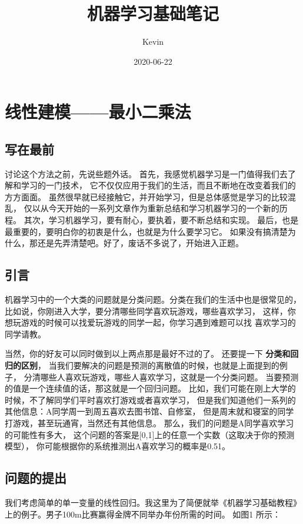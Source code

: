 \documentclass[a4paper,12pt]{book}
\begin{document}
    \title{机器学习基础笔记}
    \author{Kevin}
    \date{2020-06-22}
    \maketitle

    \newpage
    \tableofcontents

    \chapter{线性建模——最小二乘法}
    \section{写在最前}
    讨论这个方法之前，先说些题外话。
    首先，我感觉机器学习是一门值得我们去了解和学习的一门技术，
    它不仅仅应用于我们的生活，而且不断地在改变着我们的方方面面。
    虽然很早就已经接触它，并开始学习，但是总体感觉是学习的比较混乱，
    仅以从今天开始的一系列文章作为重新总结和学习机器学习的一个新的历程。
    其次，学习机器学习，要有耐心，要执着，要不断总结和实现。
    最后，也是最重要的，要明白你的初衷是什么，也就是为什么要学习它。
    如果没有搞清楚为什么，那还是先弄清楚吧。好了，废话不多说了，开始进入正题。
    
    \section{引言}
    机器学习中的一个大类的问题就是分类问题。分类在我们的生活中也是很常见的，
    比如说，你刚进入大学，要分清哪些同学喜欢玩游戏，哪些喜欢学习，
    这样，你想玩游戏的时候可以找爱玩游戏的同学一起，你学习遇到难题可以找
    喜欢学习的同学请教。
    
    
    当然，你的好友可以同时做到以上两点那是最好不过的了。
    还要提一下
    \textbf{分类和回归的区别}，
    当我们要解决的问题是预测的离散值的时候，也就是上面提到的例子，
    分清哪些人喜欢玩游戏，哪些人喜欢学习，这就是一个分类问题。
    当要预测的值是一个连续值的话，那这就是一个回归问题。
    比如，我们可能在刚上大学的时候，不了解同学们平时喜欢打游戏或者喜欢学习，
    但是我们知道他们一系列的其他信息：A同学周一到周五喜欢去图书馆、自修室，
    但是周末就和寝室的同学打游戏，甚至玩通宵，当然还有其他信息。
    那么，我们的问题是A同学喜欢学习的可能性有多大，
    这个问题的答案是[0,1]上的任意一个实数（这取决于你的预测模型），
    你可能根据你的系统推测出A喜欢学习的概率是0.51。
    

    \section{问题的提出}
    我们考虑简单的单一变量的线性回归。我这里为了简便就举《机器学习基础教程》
    上的例子。男子100m比赛赢得金牌不同举办年份所需的时间。
    如图1 所示：
\end{document}

